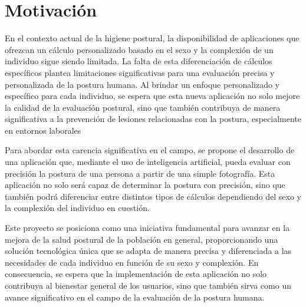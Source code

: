 \section{Motivación}
\label{sec:motivation}

En el contexto actual de la higiene postural, la disponibilidad de aplicaciones que ofrezcan un cálculo personalizado basado en el sexo y la complexión de un individuo sigue siendo limitada. 
La falta de esta diferenciación de cálculos específicos plantea limitaciones significativas para una evaluación precisa y personalizada de la postura humana. Al brindar un enfoque personalizado y específico para cada individuo, se espera que esta nueva aplicación no solo mejore la calidad de la evaluación postural, sino que también contribuya de manera significativa a la prevención de lesiones relacionadas con la postura, especialmente en entornos laborales

 Para abordar esta carencia significativa en el campo, se propone el desarrollo de una aplicación que, mediante el uso de inteligencia artificial, pueda evaluar con precisión la postura de una persona a partir de una simple fotografía. Esta aplicación no solo será capaz de determinar la postura con precisión, sino que también podrá diferenciar entre distintos tipos de cálculos dependiendo del sexo y la complexión del individuo en cuestión.

Este proyecto se posiciona como una iniciativa fundamental para avanzar en la mejora de la salud postural de la población en general, proporcionando una solución tecnológica única que se adapta de manera precisa y diferenciada a las necesidades de cada individuo en función de su sexo y complexión. En consecuencia, se espera que la implementación de esta aplicación no solo contribuya al bienestar general de los usuarios, sino que también sirva como un avance significativo en el campo de la evaluación de la postura humana.
